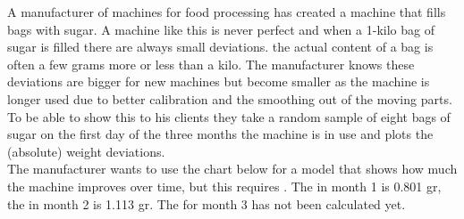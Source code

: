 

A manufacturer of machines for food processing has created a machine that fills bags with sugar. A machine like this is never perfect and when a 1-kilo bag of sugar is filled there are always small deviations. the actual content of a bag is often a few grams more or less than a kilo. The manufacturer knows these deviations are bigger for new machines but become smaller as the machine is longer used due to better calibration and the smoothing out of the moving parts. To be able to show this to his clients they take a random sample of eight bags of sugar on the first day of the three months the machine is in use and plots the (absolute) weight deviations. \\

The manufacturer wants to use the chart below for a model that shows how much the machine improves over time, but this requires . The  in month 1 is 0.801 gr, the  in month 2 is 1.113 gr. The  for month 3 has not been calculated yet. \\

